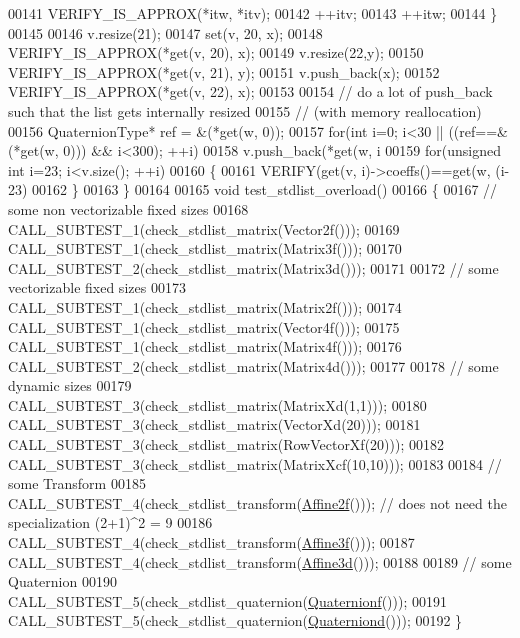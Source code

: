 \begin{DoxyCode}
00141     VERIFY\_IS\_APPROX(*itw, *itv);
00142     ++itv;
00143     ++itw;
00144   \}
00145 
00146   v.resize(21);
00147   \textcolor{keyword}{set}(v, 20, x);
00148   VERIFY\_IS\_APPROX(*\textcolor{keyword}{get}(v, 20), x);
00149   v.resize(22,y);
00150   VERIFY\_IS\_APPROX(*\textcolor{keyword}{get}(v, 21), y);
00151   v.push\_back(x);
00152   VERIFY\_IS\_APPROX(*\textcolor{keyword}{get}(v, 22), x);
00153 
00154   \textcolor{comment}{// do a lot of push\_back such that the list gets internally resized}
00155   \textcolor{comment}{// (with memory reallocation)}
00156   QuaternionType* ref = &(*\textcolor{keyword}{get}(w, 0));
00157   \textcolor{keywordflow}{for}(\textcolor{keywordtype}{int} i=0; i<30 || ((ref==&(*\textcolor{keyword}{get}(w, 0))) && i<300); ++i)
00158     v.push\_back(*\textcolor{keyword}{get}(w, i%
00159   \textcolor{keywordflow}{for}(\textcolor{keywordtype}{unsigned} \textcolor{keywordtype}{int} i=23; i<v.size(); ++i)
00160   \{
00161     VERIFY(\textcolor{keyword}{get}(v, i)->coeffs()==\textcolor{keyword}{get}(w, (i-23)%
00162   \}
00163 \}
00164 
00165 \textcolor{keywordtype}{void} test\_stdlist\_overload()
00166 \{
00167   \textcolor{comment}{// some non vectorizable fixed sizes}
00168   CALL\_SUBTEST\_1(check\_stdlist\_matrix(Vector2f()));
00169   CALL\_SUBTEST\_1(check\_stdlist\_matrix(Matrix3f()));
00170   CALL\_SUBTEST\_2(check\_stdlist\_matrix(Matrix3d()));
00171 
00172   \textcolor{comment}{// some vectorizable fixed sizes}
00173   CALL\_SUBTEST\_1(check\_stdlist\_matrix(Matrix2f()));
00174   CALL\_SUBTEST\_1(check\_stdlist\_matrix(Vector4f()));
00175   CALL\_SUBTEST\_1(check\_stdlist\_matrix(Matrix4f()));
00176   CALL\_SUBTEST\_2(check\_stdlist\_matrix(Matrix4d()));
00177 
00178   \textcolor{comment}{// some dynamic sizes}
00179   CALL\_SUBTEST\_3(check\_stdlist\_matrix(MatrixXd(1,1)));
00180   CALL\_SUBTEST\_3(check\_stdlist\_matrix(VectorXd(20)));
00181   CALL\_SUBTEST\_3(check\_stdlist\_matrix(RowVectorXf(20)));
00182   CALL\_SUBTEST\_3(check\_stdlist\_matrix(MatrixXcf(10,10)));
00183 
00184   \textcolor{comment}{// some Transform}
00185   CALL\_SUBTEST\_4(check\_stdlist\_transform(\hyperlink{group___geometry___module_ga2c1ea05a21899654ee3a2e3f91fa30e0}{Affine2f}())); \textcolor{comment}{// does not need the specialization (2+1)^2
       = 9}
00186   CALL\_SUBTEST\_4(check\_stdlist\_transform(\hyperlink{group___geometry___module_ga17e901de8ff882aea7845c5457db6a4f}{Affine3f}()));
00187   CALL\_SUBTEST\_4(check\_stdlist\_transform(\hyperlink{group___geometry___module_gaaffa69d3143826efeb84e5d6c56a4c78}{Affine3d}()));
00188 
00189   \textcolor{comment}{// some Quaternion}
00190   CALL\_SUBTEST\_5(check\_stdlist\_quaternion(\hyperlink{group___geometry___module_ga785b13a5a87f9bf55d4eba51ead2dcf0}{Quaternionf}()));
00191   CALL\_SUBTEST\_5(check\_stdlist\_quaternion(\hyperlink{group___geometry___module_ga6e77eb8b6aae0e04be2db88107dbc642}{Quaterniond}()));
00192 \}
\end{DoxyCode}
